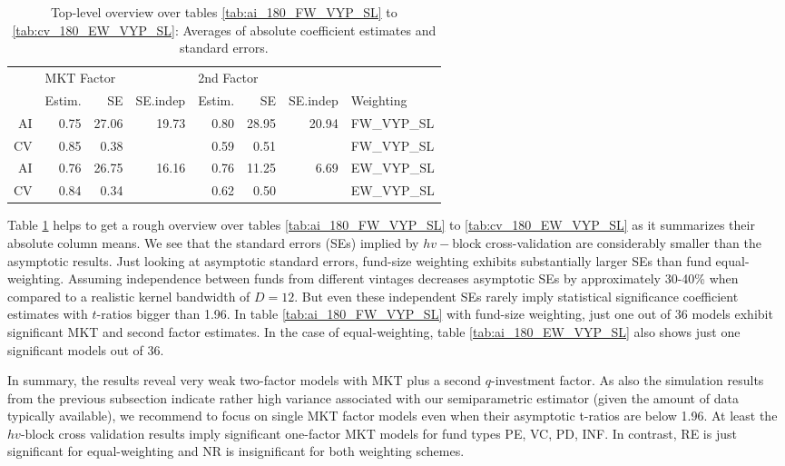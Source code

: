 \documentclass[12pt]{article}
\begin{document}
\begin{table}[ht]
	\centering
	\begin{tabular}{rrrrrrrl}
		& \multicolumn{3}{l}{MKT Factor} & \multicolumn{3}{l}{2nd Factor} &  \\ 
		& Estim. & SE & SE.indep & Estim. & SE & SE.indep & Weighting \\ 
		\hline
		\hline
		AI & 0.75 & 27.06 & 19.73 & 0.80 & 28.95 & 20.94 & FW\_VYP\_SL \\ 
		CV & 0.85 & 0.38 &  & 0.59 & 0.51 &  & FW\_VYP\_SL \\ 
		\hline
		AI & 0.76 & 26.75 & 16.16 & 0.76 & 11.25 & 6.69 & EW\_VYP\_SL \\ 
		CV & 0.84 & 0.34 &  & 0.62 & 0.50 &  & EW\_VYP\_SL \\ 
		\hline
		\hline
	\end{tabular}
	\caption{
		Top-level overview over tables \ref{tab:ai_180_FW_VYP_SL} to \ref{tab:cv_180_EW_VYP_SL}: Averages of absolute coefficient estimates and standard errors.} 
	\label{tab:ai_sum_abs}
\end{table}

Table \ref{tab:ai_sum_abs} helps to get a rough overview over tables \ref{tab:ai_180_FW_VYP_SL} to \ref{tab:cv_180_EW_VYP_SL} as it summarizes their absolute column means.
We see that the standard errors (SEs) implied by $hv-$block cross-validation are considerably smaller than the asymptotic results.
Just looking at asymptotic standard errors, fund-size weighting exhibits substantially larger SEs than fund equal-weighting.
Assuming independence between funds from different vintages decreases asymptotic SEs by approximately 30-40\% when compared to a realistic kernel bandwidth of $D=12$.
But even these independent SEs rarely imply statistical significance coefficient estimates with $t$-ratios bigger than 1.96.
In table \ref{tab:ai_180_FW_VYP_SL} with fund-size weighting, just one out of 36 models exhibit significant MKT and second factor estimates.
In the case of equal-weighting, table \ref{tab:ai_180_EW_VYP_SL} also shows just one significant models out of 36.

In summary, the results reveal very weak two-factor models with MKT plus a second $q$-investment factor.
As also the simulation results from the previous subsection indicate rather high variance associated with our semiparametric estimator (given the amount of data typically available), we recommend to focus on single MKT factor models even when their asymptotic t-ratios are below 1.96.
At least the $hv$-block cross validation results imply significant one-factor MKT models for fund types PE, VC, PD, INF. 
In contrast, RE is just significant for equal-weighting and NR is insignificant for both weighting schemes.
\end{document}
